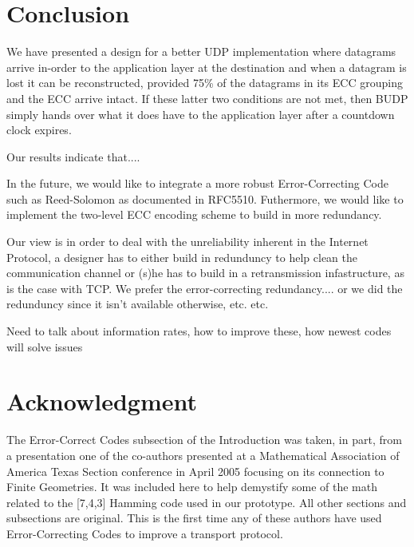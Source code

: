 \documentclass[conference]{IEEEtran}
\theoremstyle{definition}
\begin{document}
\section{Conclusion}
We have presented a design for a better UDP implementation
where datagrams arrive in-order to the application layer
at the destination and when a datagram is lost it can be
reconstructed, provided 75\% of the datagrams in its ECC
grouping and the ECC arrive intact.  If these latter two
conditions are not met, then BUDP simply hands over what
it does have to the application layer after a countdown
clock expires.

Our results indicate that....


In the future, we would like to integrate a more robust
Error-Correcting Code such as Reed-Solomon as documented
in RFC5510.  Futhermore, we would like to implement the
two-level ECC encoding scheme to build in more redundancy.

Our view is in order to deal with the unreliability inherent
in the Internet Protocol, a designer has to either build
in redunduncy to help clean the communication channel or
(s)he has to build in a retransmission infastructure, as
is the case with TCP.  We prefer the error-correcting redundancy....
or we did the redunduncy since it isn't available otherwise, etc.
etc.

Need to talk about information rates, how to improve
these, how newest codes will solve issues





\section*{Acknowledgment}
The Error-Correct Codes subsection of the Introduction
was taken, in part, from a presentation one of the co-authors
presented at a Mathematical Association of America
Texas Section conference in April 2005 \cite{clanton2005maa}
focusing on its connection to Finite Geometries.
It was included here to help demystify some of the math
related to the [7,4,3] Hamming code used in our prototype.
All other sections and subsections are original.  This is the
first time any of these authors have used Error-Correcting
Codes to improve a transport protocol.




\end{document}
